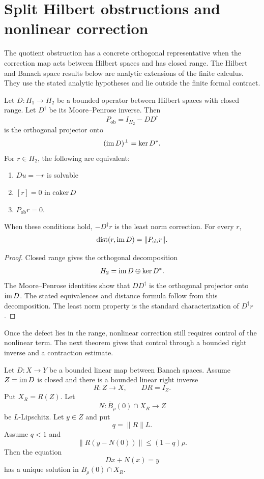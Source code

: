 \section{Split Hilbert obstructions and nonlinear correction}\label{sec:split_obstruction}

The quotient obstruction has a concrete orthogonal representative when the correction map acts between Hilbert spaces and has closed range. The Hilbert and Banach space results below are analytic extensions of the finite calculus. They use the stated analytic hypotheses and lie outside the finite formal contract.

\begin{theorem}\label{thm:orthogonal_obstruction}
Let $D:H_1\to H_2$ be a bounded operator between Hilbert spaces with closed range.  Let $D^\dagger$ be its Moore--Penrose inverse.  Then
\[
P_{\mathrm{ob}}=I_{H_2}-DD^\dagger
\]
is the orthogonal projector onto
\[
(\operatorname{im} D)^\perp=\operatorname{ker} D^*.
\]
For $r\in H_2$, the following are equivalent:
\begin{enumerate}
\item $Du=-r$ is solvable
\item $[r]=0$ in $\operatorname{coker} D$
\item $P_{\mathrm{ob}}r=0$.
\end{enumerate}
When these conditions hold, $-D^\dagger r$ is the least norm correction.  For every $r$,
\[
\operatorname{dist}(r,\operatorname{im} D)=\|P_{\mathrm{ob}}r\|.
\]
\end{theorem}

\begin{proof}
Closed range gives the orthogonal decomposition
\[
H_2=\operatorname{im} D\oplus\operatorname{ker} D^*.
\]
The Moore--Penrose identities show that $DD^\dagger$ is the orthogonal projector onto $\operatorname{im} D$.  The stated equivalences and distance formula follow from this decomposition.  The least norm property is the standard characterization of $D^\dagger r$.
\end{proof}

Once the defect lies in the range, nonlinear correction still requires control of the nonlinear term. The next theorem gives that control through a bounded right inverse and a contraction estimate.

\begin{theorem}\label{thm:right_inverse_correction}
Let $D:X\to Y$ be a bounded linear map between Banach spaces.  Assume $Z=\operatorname{im} D$ is closed and there is a bounded linear right inverse
\[
R:Z\longrightarrow X,
\qquad
DR=I_Z.
\]
Put $X_R=R(Z)$.  Let
\[
N:\overline B_\rho(0)\cap X_R\longrightarrow Z
\]
be $L$-Lipschitz.  Let $y\in Z$ and put
\[
q=\|R\|L.
\]
Assume $q<1$ and
\[
\|R(y-N(0))\|
\le
(1-q)\rho.
\]
Then the equation
\[
Dx+N(x)=y
\]
has a unique solution in $\overline B_\rho(0)\cap X_R$.
\end{theorem}

